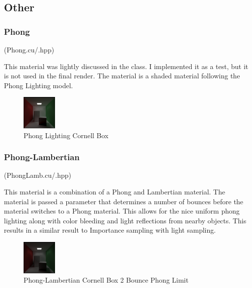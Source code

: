 \documentclass{article}
\begin{document}
    \subsection{Other}



        \subsubsection{Phong}
        (Phong.cu/.hpp)\par
        This material was lightly discussed in the class. I implemented it as a test, but it is not used in the final render. The material is a shaded material following the Phong Lighting model. \par
        \begin{figure}[H]
            \centering
            \includegraphics[width=0.15\textwidth]{samples/Phong1bnc50000spls512p.png}
            \caption{Phong Lighting Cornell Box}
        \end{figure}


        \subsubsection{Phong-Lambertian}
        (PhongLamb.cu/.hpp)\par
        This material is a combination of a Phong and Lambertian material. The material is passed a parameter that determines a number of bounces before the material switches to a Phong material. This allows for the nice uniform phong lighting along with color bleeding and light reflections from nearby objects. This results in a similar result to Importance sampling with light sampling.\par
        \begin{figure}[H]
            \centering
            \includegraphics[width=0.15\textwidth]{samples/4k5000s2bnc.jpg}
            \caption{Phong-Lambertian Cornell Box 2 Bounce Phong Limit}
        \end{figure}
\end{document}
